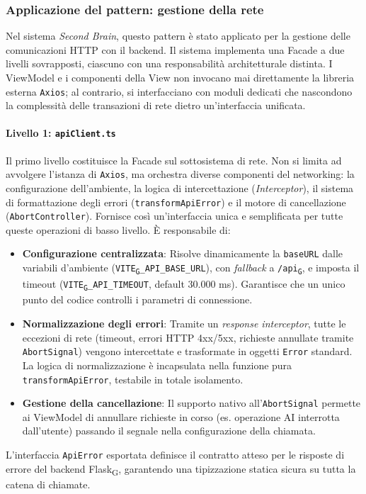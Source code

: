 \documentclass[11pt,a4paper]{article}
\newcommand{\gls}[1]{#1\textsubscript{G}}
\begin{document}
\subsubsection{Applicazione del pattern: gestione della rete}
Nel sistema \textit{Second Brain}, questo pattern è stato applicato per la gestione delle comunicazioni HTTP con il backend. Il sistema implementa una Facade a due livelli sovrapposti, ciascuno con una responsabilità architetturale distinta. I ViewModel e i componenti della View non invocano mai direttamente la libreria esterna \texttt{Axios}; al contrario, si interfacciano con moduli dedicati che nascondono la complessità delle transazioni di rete dietro un'interfaccia unificata.

\paragraph{Livello 1: \texttt{apiClient.ts}}
Il primo livello costituisce la Facade sul sottosistema di rete. Non si limita ad avvolgere l'istanza di \texttt{Axios}, ma orchestra diverse componenti del networking: la configurazione dell'ambiente, la logica di intercettazione (\textit{Interceptor}), il sistema di formattazione degli errori (\texttt{transformApiError}) e il motore di cancellazione (\texttt{AbortController}). Fornisce così un'interfaccia unica e semplificata per tutte queste operazioni di basso livello. È responsabile di:
\begin{itemize}
    \item \textbf{Configurazione centralizzata}: Risolve dinamicamente la \texttt{baseURL} dalle variabili d'ambiente (\texttt{\gls{VITE}\_API\_BASE\_URL}), con \textit{fallback} a \texttt{/\gls{api}}, e imposta il timeout (\texttt{\gls{VITE}\_API\_TIMEOUT}, default 30.000 ms). Garantisce che un unico punto del codice controlli i parametri di connessione.
    \item \textbf{Normalizzazione degli errori}: Tramite un \textit{response interceptor}, tutte le eccezioni di rete (timeout, errori HTTP 4xx/5xx, richieste annullate tramite \texttt{AbortSignal}) vengono intercettate e trasformate in oggetti \texttt{Error} standard. La logica di normalizzazione è incapsulata nella funzione pura \texttt{transformApiError}, testabile in totale isolamento.
    \item \textbf{Gestione della cancellazione}: Il supporto nativo all'\texttt{AbortSignal} permette ai ViewModel di annullare richieste in corso (es. operazione AI interrotta dall'utente) passando il segnale nella configurazione della chiamata.
\end{itemize}
L'interfaccia \texttt{ApiError} esportata definisce il contratto atteso per le risposte di errore del backend \gls{Flask}, garantendo una tipizzazione statica sicura su tutta la catena di chiamate.
\end{document}
